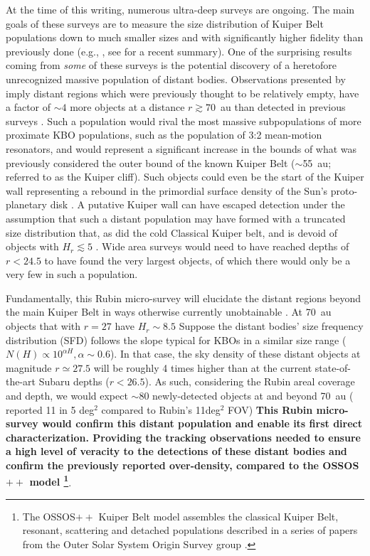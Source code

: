 \documentclass[modern,preprint]{aastex7}
\begin{document}
At the time of this writing, numerous ultra-deep surveys are ongoing. The main goals of these surveys are to measure the size distribution of Kuiper Belt populations down to much smaller sizes and with significantly higher fidelity than previously done (e.g., \citet{Smotherman2024}, see \citet{Lawler24} for a recent summary). 
One of the surprising results coming from \emph{some} of these surveys is the potential discovery of a heretofore unrecognized massive population of distant bodies. 
Observations presented by \citet{Fraser2024PSJ} imply distant regions which were previously thought to be relatively empty, have a factor of $\sim4$ more objects at a distance $r\gtrsim70$~au than detected in previous surveys \citep{Bannister2018}. 
Such a population would rival the most massive subpopulations of more proximate KBO populations, such as the population of 3:2 mean-motion resonators, and would represent a significant increase in the bounds of what was previously considered the outer bound of the known Kuiper Belt ($\sim$55~au;  referred to as the Kuiper cliff). Such objects could even be the start of the Kuiper wall representing a rebound in the primordial surface density of the Sun's proto-planetary disk \citep{Chiang1999}.
A putative Kuiper wall can have escaped detection under the assumption that such a distant population may have formed with a truncated size distribution that, as did the cold Classical Kuiper belt, and is devoid of objects with $H_r \lesssim 5$ \citep{Gladman2022, Peltier2022}.
Wide area surveys would need to have reached depths of  $r<24.5$ to have found the very largest objects, of which there would only be a very few in such a population. 

Fundamentally, this Rubin micro-survey will elucidate the distant regions beyond the main Kuiper Belt in ways otherwise currently unobtainable \citep{Kavelaars2020}. 
At 70~au objects that with $r=27$ have $H_r \sim 8.5$
Suppose the distant bodies' size frequency distribution (SFD) follows the slope typical for KBOs in a similar size range ($N(H) \propto 10^{\alpha H}, \alpha\sim0.6$). 
In that case, the sky density of these distant objects at magnitude $r\simeq27.5$ will be roughly 4 times higher than at the current state-of-the-art Subaru depths ($r<26.5$). 
As such, considering the Rubin areal coverage and depth, we would expect $\sim$80 newly-detected objects at and beyond 70~au (\citet{Fraser2024PSJ} reported 11 in 5 deg$^2$ compared to Rubin's 11deg$^2$ FOV) 
{\bf This Rubin micro-survey would confirm this distant population and enable its first direct characterization. 
Providing the tracking observations needed to ensure a high level of veracity to the detections of these distant bodies and confirm the previously reported over-density, compared to the OSSOS$++$ model \citep{Petit2023DPS}\footnote{The OSSOS$++$ Kuiper Belt model assembles the classical Kuiper Belt, resonant, scattering and detached populations described in a series of papers from the Outer Solar System Origin Survey group \citet{Bannister2018, Lawler2018, Kavelaars2021, Crompvoets2022, Petit2023, beaudoin2023}.}}. 
\end{document}
